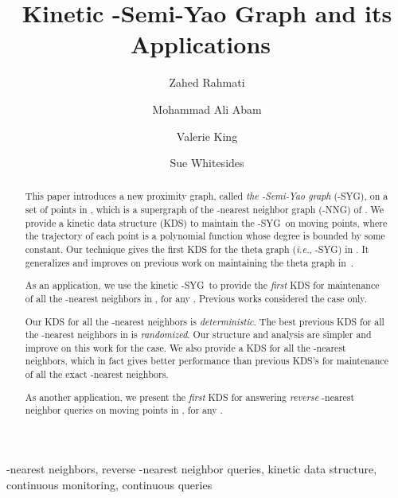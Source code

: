 \documentclass[preprint,12pt]{elsarticle}
\def\knng{\mbox{-NNG}}
\def\ksyg{\mbox{-SYG}}
\def\1syg{\mbox{-SYG}}
\newcommand{\ie}{\emph{i.e.}}
\begin{document}
\begin{frontmatter}


\title{Kinetic -Semi-Yao Graph and its Applications~}



\author{Zahed Rahmati}

\author[rvt2]{Mohammad Ali Abam}

\author[rvt1]{Valerie King}

\author[rvt1]{Sue Whitesides}





\address[rvt2]{Dept. of Computer Engineering, Sharif University of Technology, Tehran, Iran.}
\address[rvt1]{Dept. of Computer Science, University of Victoria, Victoria, Canada.}



\begin{abstract}
This paper introduces a new proximity graph, called \textit{the -Semi-Yao graph} (\ksyg), on a set  of points in , which is a supergraph of the -nearest neighbor graph (\knng) of . We provide a kinetic data structure (KDS) to maintain the \ksyg~on moving points, where the trajectory of each point is a polynomial function whose degree is bounded by some constant. Our technique gives the first KDS for the theta graph (\ie, \1syg) in . It generalizes and improves on previous work on maintaining the theta graph in~. 

As an application, we use the kinetic \ksyg~to provide the \textit{first} KDS for maintenance of all the -nearest neighbors in , for any . Previous works considered the  case only.

Our KDS for all the -nearest neighbors is \textit{deterministic}. The best previous KDS for all the -nearest neighbors in  is \textit{randomized}. Our structure and analysis are simpler and improve on this work for the  case. We also provide a KDS for all the -nearest neighbors, which in fact gives better performance than previous KDS's for maintenance of all the exact -nearest neighbors.

As another application, we present the \textit{first} KDS for answering \textit{reverse} -nearest neighbor queries on moving points in , for any .
\end{abstract}
\begin{keyword}
-nearest neighbors, reverse -nearest neighbor queries, kinetic data structure, continuous monitoring, continuous queries
\end{keyword}

\end{frontmatter}
\end{document}
